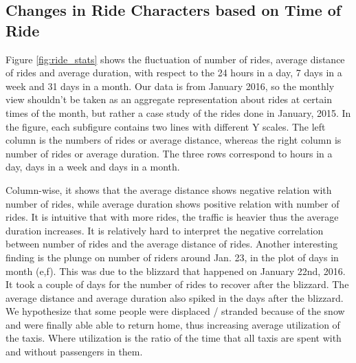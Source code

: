 \documentclass{article}
\begin{document}
\subsection{Changes in Ride Characters based on Time of Ride}

Figure \ref{fig:ride_stats} shows the fluctuation of number of rides, average distance of rides and average duration, with respect to the 24 hours in a day, 7 days in a week and 31 days in a month. Our data is from January 2016, so the monthly view shouldn't be taken as an aggregate representation about rides at certain times of the month, but rather a case study of the rides done in January, 2015. In the figure, each subfigure contains two lines with different Y scales. The left column is the numbers of rides or average distance, whereas the right column is number of rides or average duration. The three rows correspond to hours in a day, days in a week and days in a month.

Column-wise, it shows that the average distance shows negative relation with number of rides, while average duration shows positive relation with number of rides. It is intuitive that with more rides, the traffic is heavier thus the average duration increases. It is relatively hard to interpret the negative correlation between number of rides and the average distance of rides. Another interesting finding is the plunge on number of riders around Jan. 23, in the plot of days in month (e,f). This was due to the blizzard that happened on January 22nd, 2016. It took a couple of days for the number of rides to recover after the blizzard. The average distance and average duration also spiked in the days after the blizzard. We hypothesize that some people were displaced / stranded because of the snow and were finally able able to return home, thus increasing average utilization of the taxis. Where utilization is the ratio of the time that all taxis are spent with and without passengers in them. 
\end{document}
